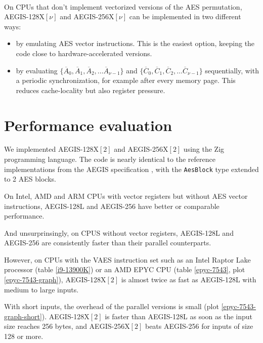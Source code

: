\documentclass[envcountsame,runningheads,notitlepage]{llncs}
\begin{document}
\paragraph{}

On CPUs that don't implement vectorized versions of the AES permutation, AEGIS-128X$[\nu]$ and AEGIS-256X$[\nu]$ can be implemented in two different ways:

\begin{itemize}
  \item by emulating AES vector instructions. This is the easiest option, keeping the code close to hardware-accelerated versions.
  \item by evaluating $\{ \overline{A}_0, \overline{A}_1, \overline{A}_2, \ldots \overline{A}_{\nu-1} \}$ and $\{ \overline{C}_0, \overline{C}_1, \overline{C}_2, \ldots \overline{C}_{\nu-1} \}$ sequentially, with a periodic synchronization, for example after every memory page. This reduces cache-locality but also register pressure.
\end{itemize}

\section{Performance evaluation}
\label{sec:performance evaluation}

We implemented AEGIS-128X$[2]$ and AEGIS-256X$[2]$ using the Zig programming language. The code \cite{GitHub:AEGISX} is nearly identical to the reference implementations from the AEGIS specification \cite{DSL2023}, with the \lstinline{AesBlock} type extended to 2 AES blocks.

On Intel, AMD and ARM CPUs with vector registers but without AES vector instructions, AEGIS-128L and AEGIS-256 have better or comparable performance.

And unsurprinsingly, on CPUS without vector registers, AEGIS-128L and AEGIS-256 are consistently faster than their parallel counterparts.

However, on CPUs with the VAES instruction set such as an Intel Raptor Lake processor (table \ref{i9-13900K}) or an AMD EPYC CPU (table \ref{epyc-7543}, plot \ref{epyc-7543-graph}), AEGIS-128X$[2]$ is almost twice as fast as AEGIS-128L with medium to large inputs.

With short inputs, the overhead of the parallel versions is small (plot \ref{epyc-7543-graph-short}). AEGIS-128X$[2]$ is faster than AEGIS-128L as soon as the input size reaches 256 bytes, and AEGIS-256X$[2]$ beats AEGIS-256 for inputs of size 128 or more.
\end{document}
